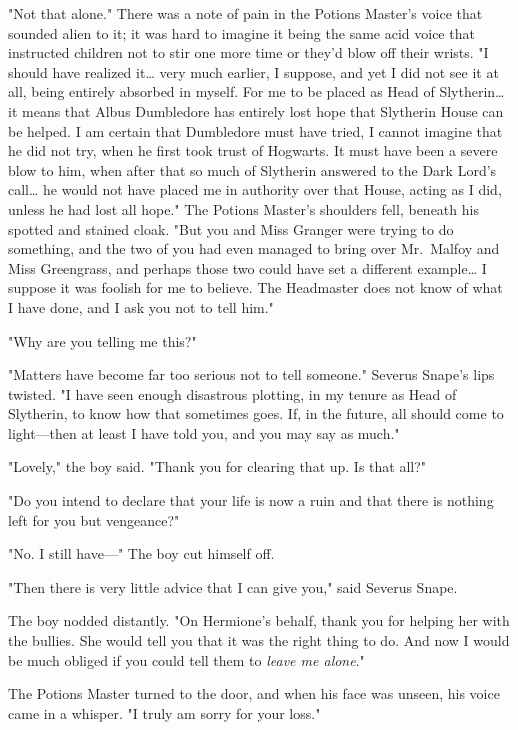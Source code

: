 "Not that alone." There was a note of pain in the Potions Master's voice that 
sounded alien to it; it was hard to imagine it being the same acid voice that 
instructed children not to stir one more time or they'd blow off their wrists. 
"I should have realized it{\ldots} very much earlier, I suppose, and yet I did 
not see it at all, being entirely absorbed in myself. For me to be placed as 
Head of Slytherin{\ldots} it means that Albus Dumbledore has entirely lost hope 
that Slytherin House can be helped. I am certain that Dumbledore must have 
tried, I cannot imagine that he did not try, when he first took trust of 
Hogwarts. It must have been a severe blow to him, when after that so much of 
Slytherin answered to the Dark Lord's call{\ldots} he would not have placed me 
in authority over that House, acting as I did, unless he had lost all hope." 
The Potions Master's shoulders fell, beneath his spotted and stained cloak. 
"But you and Miss Granger were trying to do something, and the two of you had 
even managed to bring over Mr.~Malfoy and Miss Greengrass, and perhaps those 
two could have set a different example{\ldots} I suppose it was foolish for me 
to believe. The Headmaster does not know of what I have done, and I ask you not 
to tell him."

"Why are you telling me this?"

"Matters have become far too serious not to tell someone." Severus Snape's lips 
twisted. "I have seen enough disastrous plotting, in my tenure as Head of 
Slytherin, to know how that sometimes goes. If, in the future, all should come 
to light---then at least I have told you, and you may say as much."

"Lovely," the boy said. "Thank you for clearing that up. Is that all?"

"Do you intend to declare that your life is now a ruin and that there is 
nothing left for you but vengeance?"

"No. I still have---" The boy cut himself off.

"Then there is very little advice that I can give you," said Severus Snape.

The boy nodded distantly. "On Hermione's behalf, thank you for helping her with 
the bullies. She would tell you that it was the right thing to do. And now I 
would be much obliged if you could tell them to \emph{leave me alone}."

The Potions Master turned to the door, and when his face was unseen, his voice 
came in a whisper. "I truly am sorry for your loss."

